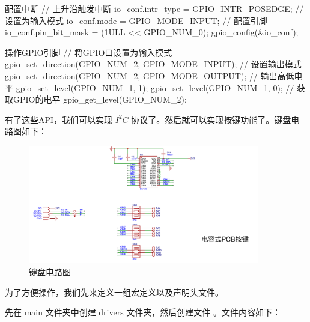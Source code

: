 \documentclass[lang=cn,newtx,10pt,scheme=chinese]{elegantbook}
\begin{document}
\begin{mycode}{配置中断}
// 上升沿触发中断
io_conf.intr_type = GPIO_INTR_POSEDGE;
// 设置为输入模式
io_conf.mode = GPIO_MODE_INPUT;
// 配置引脚
io_conf.pin_bit_mask = (1ULL << GPIO_NUM_0);
gpio_config(&io_conf);
\end{mycode}

\begin{mycode}{操作GPIO引脚}
// 将GPIO口设置为输入模式
gpio_set_direction(GPIO_NUM_2, GPIO_MODE_INPUT);
// 设置输出模式
gpio_set_direction(GPIO_NUM_2, GPIO_MODE_OUTPUT);
// 输出高低电平
gpio_set_level(GPIO_NUM_1, 1);
gpio_set_level(GPIO_NUM_1, 0);
// 获取GPIO的电平
gpio_get_level(GPIO_NUM_2);
\end{mycode}

有了这些API，我们可以实现 $I^2C$ 协议了。然后就可以实现按键功能了。键盘电路图如下：

\begin{figure}[!htb]
\centering
\includegraphics[width=0.9\textwidth]{keyboard.png}
\caption{键盘电路图}
\end{figure}

为了方便操作，我们先来定义一组宏定义以及声明头文件。

先在 main 文件夹中创建 drivers 文件夹，然后创建文件  。文件内容如下：
\end{document}
